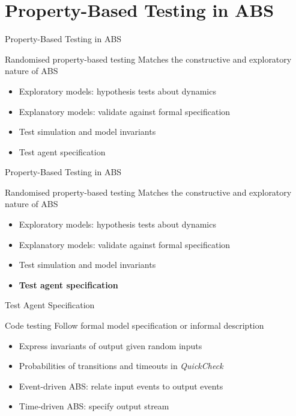 \documentclass{beamer} %
\begin{document}
\section{Property-Based Testing in ABS}
\begin{frame}{Property-Based Testing in ABS}
\begin{block}{Randomised property-based testing}
Matches the constructive and exploratory nature of ABS
\end{block}

  \begin{itemize}
    \item Exploratory models: hypothesis tests about dynamics
    \item Explanatory models: validate against formal specification
    \item Test simulation and model invariants
    \item Test agent specification
  \end{itemize}
\end{frame}

\begin{frame}{Property-Based Testing in ABS}
\begin{block}{Randomised property-based testing}
Matches the constructive and exploratory nature of ABS
\end{block}

  \begin{itemize}
    \item Exploratory models: hypothesis tests about dynamics
    \item Explanatory models: validate against formal specification
    \item Test simulation and model invariants
    \item \textbf{Test agent specification}
  \end{itemize}
\end{frame}

\begin{frame}{Test Agent Specification}
\begin{block}{Code testing}
Follow formal model specification or informal description
\end{block}

\begin{block}{}
  \begin{itemize}
  	\item Express invariants of output given random inputs
  	\item Probabilities of transitions and timeouts in \textit{QuickCheck}
    \item Event-driven ABS: relate input events to output events 
    \item Time-driven ABS: specify output stream
  \end{itemize}
\end{block}
\end{frame}
\end{document}

